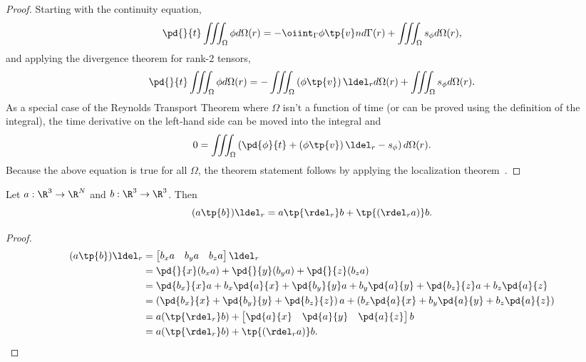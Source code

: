 \begin{proof}
    Starting with the continuity equation,
    \begin{equation}
        \pd{}{t} \iiint_\Omega \phi d\Omega(r) =
        -\oiint_\Gamma \phi \tp{v} n d\Gamma(r)
        + \iiint_\Omega s_\phi d\Omega(r),
    \end{equation}
    and applying the divergence theorem for rank-2 tensors,
    \begin{equation}
        \pd{}{t} \iiint_\Omega \phi d\Omega(r) =
        -\iiint_\Omega \left(\phi \tp{v} \right) \ldel_r d\Omega(r)
        + \iiint_\Omega s_\phi d\Omega(r).
    \end{equation}
    As a special case of the Reynolds Transport Theorem where $\Omega$ isn't
    a function of time (or can be proved using the definition of the integral),
    the time derivative on the left-hand side can be moved into the integral and
    \begin{equation}
        0 = \iiint_\Omega \left( \pd{\phi}{t} +
        \left(\phi \tp{v} \right) \ldel_r
        - s_\phi \right) d\Omega(r).
    \end{equation}
    Because the above equation is true for all $\Omega$, the theorem
    statement follows by applying the localization theorem~\cite{wiki}.
\end{proof}

\begin{lem}
Let $a:\R^3\to \R^N$ and $b:\R^3\to \R^3$.  Then
\begin{equation}
    \label{lem:nablaab}
    (a\tp{b})\ldel_r = a \tp{\rdel_r} b  + \tp{(\rdel_r a)} b.
\end{equation}
\end{lem}
\begin{proof}
    \begin{align}
        (a\tp{b})\ldel_r &= \begin{bmatrix}
            b_x a & b_y a & b_z a
        \end{bmatrix} \ldel_r \\
        &= \pd{}{x} (b_x a) + \pd{}{y} (b_y a) + \pd{}{z} (b_z a) \\
        &= \pd{b_x}{x} a + b_x \pd{a}{x} +
           \pd{b_y}{y} a + b_y \pd{a}{y} +
           \pd{b_z}{z} a + b_z \pd{a}{z} \\
        &= \left( \pd{b_x}{x} + \pd{b_y}{y} + \pd{b_z}{z} \right)a +
           \left(b_x \pd{a}{x} + b_y \pd{a}{y} + b_z \pd{a}{z} \right) \\
        &= a ( \tp{\rdel_r} b ) + \begin{bmatrix}
            \pd{a}{x} & \pd{a}{y} & \pd{a}{z}
        \end{bmatrix} b \\
        &= a (\tp{\rdel_r} b) + \tp{(\rdel_r a)} b.
    \end{align}
\end{proof}

